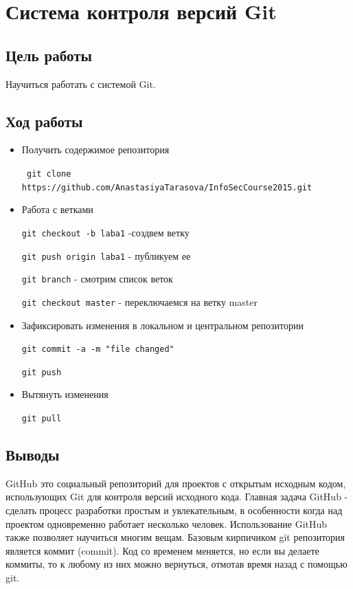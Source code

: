 \documentclass[12pt,a4paper]{article}
\begin{document}
\newpage
\section{Система контроля версий Git}

\subsection{Цель работы}
Научиться работать с системой Git.
\subsection{Ход работы}
\begin{itemize}
\item Получить содержимое репозитория

\verb+ git clone https://github.com/AnastasiyaTarasova/InfoSecCourse2015.git+

\item Работа с ветками

\verb+git checkout -b laba1+ -создвем ветку

\verb+git push origin laba1+ - публикуем ее

\verb+git branch+ - смотрим список веток

\verb+git checkout master+ - переключаемся на ветку master

\item Зафиксировать изменения в локальном и центральном репозитории

\verb+git commit -a -m "file changed"+ 

\verb+git push+ 

\item Вытянуть изменения

\verb+git pull+

\end{itemize}

\subsection{Выводы}
GitHub это социальный репозиторий для проектов с открытым исходным кодом, использующих Git для контроля версий исходного кода. Главная задача GitHub - сделать процесс разработки простым и увлекательным, в особенности когда над проектом одновременно работает несколько человек. Использование GitHub также позволяет научиться многим вещам. Базовым кирпичиком git репозитория является коммит (commit). Код со временем меняется, но если вы делаете коммиты, то к любому из них можно вернуться, отмотав время назад с помощью git.
\newpage
\end{document}
